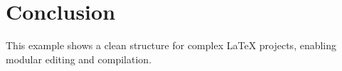 \section{Conclusion}
This example shows a clean structure for complex LaTeX projects, enabling modular editing and compilation.


